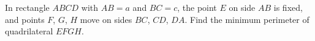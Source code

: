 In rectangle $ABCD$ with $AB=a$ and $BC=c$, the point $E$ on side $AB$ is fixed, and points $F$, $G$, $H$ move on sides $BC$, $CD$, $DA$. Find the minimum perimeter of quadrilateral $EFGH$.
